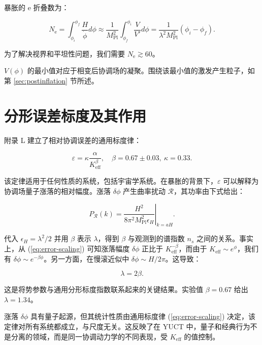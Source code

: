 \documentclass[12pt]{article}
\theoremstyle{remark}
\newcommand{\Keff}{K_{\mathrm{eff}}}
\newcommand{\eps}{\varepsilon}
\newcommand{\kappac}{\kappa}
\newcommand{\Mpl}{M_{\mathrm{Pl}}}
\newcommand{\ninf}{N_{\mathrm{e}}}
\begin{document}
	暴胀的 e 折叠数为：
	
	\begin{equation}
		\ninf = \int_{\phi_i}^{\phi_f} \frac{H}{\dot{\phi}} d\phi \approx \frac{1}{\Mpl^2} \int_{\phi_f}^{\phi_i} \frac{V}{V'} d\phi = \frac{1}{\lambda^2 \Mpl^2} (\phi_i - \phi_f).
	\end{equation}
	
	为了解决视界和平坦性问题，我们需要 $\ninf \gtrsim 60$。
	
	$V(\phi)$ 的最小值对应于相变后协调场的凝聚。围绕该最小值的激发产生粒子，如第 \ref{sec:postinflation} 节所述。
	
	\section{分形误差标度及其作用}
	\label{sec:fractal}
	
	附录 L 建立了相对协调误差的通用标度律：
	
	\begin{equation}
		\eps = \kappac \frac{\alpha}{\Keff^{\beta}}, \quad \beta = 0.67 \pm 0.03,\ \kappac = 0.33.
		\label{eq:error-scaling}
	\end{equation}
	
	该定律适用于任何性质的系统，包括宇宙学系统。在暴胀的背景下，$\eps$ 可以解释为协调场量子涨落的相对幅度。涨落 $\delta \phi$ 产生曲率扰动 $\mathcal{R}$，其功率由下式给出：
	
	\begin{equation}
		P_{\mathcal{R}}(k) = \left. \frac{H^2}{8\pi^2 \Mpl^2 \epsilon_H} \right|_{k=aH}.
	\end{equation}
	
	代入 $\epsilon_H = \lambda^2/2$ 并用 $\beta$ 表示 $\lambda$，得到 $\beta$ 与观测到的谱指数 $n_s$ 之间的关系。事实上，从 (\ref{eq:error-scaling}) 可知涨落幅度 $\delta \phi$ 正比于 $\Keff^{-\beta}$，而由于 $\Keff \sim e^{\phi}$，我们有 $\delta \phi \sim e^{-\beta \phi}$。另一方面，在慢滚近似中 $\delta \phi \sim H/2\pi$。这导致：
	
	\begin{equation}
		\lambda = 2\beta.
		\label{eq:lambda-beta}
	\end{equation}
	
	这是将势参数与通用分形标度指数联系起来的关键结果。实验值 $\beta = 0.67$ 给出 $\lambda = 1.34$。
	
	涨落 $\delta\phi$ 具有量子起源，但其统计性质由通用标度律 (\ref{eq:error-scaling}) 决定，该定律对所有系统都成立，与尺度无关。这反映了在 YUCT 中，量子和经典行为不是分离的领域，而是同一协调动力学的不同表现，受 $K_{\mathrm{eff}}$ 的值控制。
	
\end{document}
